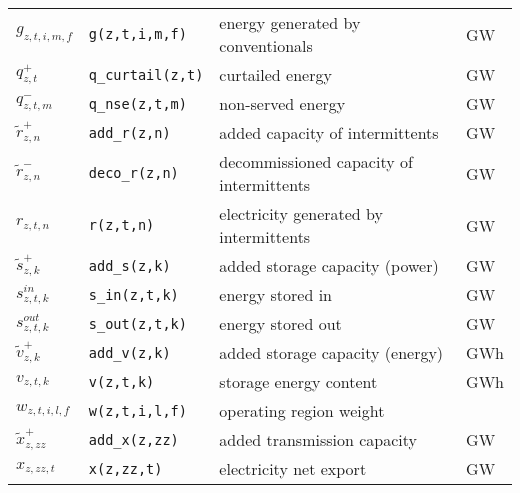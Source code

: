 \documentclass[review, 3p, times, 12pt, authoryear]{elsarticle}
\begin{document}
\begin{longtable}{p{}p{}p{}p{}}
        \\
        $g_{z,t,i,m,f}$ & \texttt{g(z,t,i,m,f)} & energy generated by conventionals & GW \\
        $q^{+}_{z,t}$ & \texttt{q\_curtail(z,t)} & curtailed energy & GW \\
        $q^{-}_{z,t,m}$ & \texttt{q\_nse(z,t,m)} & non-served energy & GW \\
        $\widetilde{r}^{+}_{z,n}$ & \texttt{add\_r(z,n)} & added capacity of intermittents & GW \\
        $\widetilde{r}^{-}_{z,n}$ & \texttt{deco\_r(z,n)} & decommissioned capacity of intermittents
        & GW
        \\
        $r_{z,t,n}$ & \texttt{r(z,t,n)} & electricity generated by intermittents & GW \\
        $\widetilde{s}^{+}_{z,k}$ & \texttt{add\_s(z,k)} & added storage capacity (power) & GW \\
        $s^{in}_{z,t,k}$ & \texttt{s\_in(z,t,k)} & energy stored in & GW \\
        $s^{out}_{z,t,k}$ & \texttt{s\_out(z,t,k)} & energy stored out & GW \\
        $\widetilde{v}^{+}_{z,k}$ & \texttt{add\_v(z,k)} & added storage capacity (energy) & GWh \\
        $v_{z,t,k}$ & \texttt{v(z,t,k)} & storage energy content & GWh \\
        $w_{z,t,i,l,f}$ & \texttt{w(z,t,i,l,f)} & operating region weight & \\
        $\widetilde{x}^{+}_{z,zz}$ & \texttt{add\_x(z,zz)} & added transmission capacity & GW \\
        $x_{z,zz,t}$ & \texttt{x(z,zz,t)} & electricity net export & GW \\
    \end{longtable}

    \newpage
\end{document}
